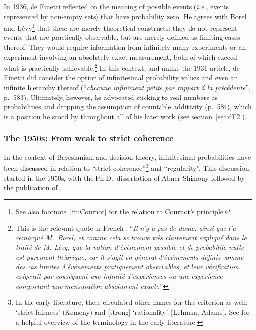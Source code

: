 In 1936, de Finetti reflected on the meaning of possible events (\textit{i.e.}, events represented by non-empty sets) that have probability zero. He agrees with Borel and L{\'e}vy\footnote{See also footnote~\ref{fn:Cournot} for the relation to Cournot's principle.} that these are merely theoretical constructs: they do not represent events that are practically observable, but are merely defined as limiting cases thereof. They would require information from infinitely many experiments or an experiment involving an absolutely exact measurement, both of which exceed what is practically achievable.\footnote{This is the relevant quote in French \citep[p.~577]{deFinetti:1936}: ``\textit{Il n'y a pas de doute, ainsi que l'a remarqu\'{e} M.\ Borel, et comme cela se trouve tr\`{e}s clairement expliqu\'{e} dans le trait\'{e} de M. L\'{e}vy, que la notion d'\'{e}v\'{e}nement possible et de probabilite nulle est purement th\'{e}orique, car il s'agit en g\'{e}neral d'\'{e}v\'{e}nements d\'{e}finis comme des cas limites d'\'{e}v\'{e}nements pratiquement observables, et leur v\'{e}rification exigerait par cons\'{e}quent une \emph{infinit\'{e}} d'exp\'{e}riences ou une exp\'{e}rience comportant une mensuration absolument \emph{exacte}}.''}
In this context, and unlike the 1931 article, de Finetti did consider the option of infinitesimal probability values and even an infinite hierarchy thereof (``\textit{chacune infiniment petite par rapport \'{a} la pr\'{e}c\'{e}dente}'', p.~583). Ultimately, however, he advocated sticking to real numbers as probabilities and dropping the assumption of countable additivity (p.~584), which is a position he stood by throughout all of his later work (see section~\ref{sec:dF2}).

\subsubsection*{The 1950s: From weak to strict coherence}\label{sec:coherence}
In the context of Bayesianism and decision theory, infinitesimal probabilities have been discussed in relation to ``strict coherence''\footnote{In the early literature, there circulated other names for this criterion as well: `strict fairness' (Kemeny) and [strong] `rationality' (Lehman, Adams). See \citet[p.~114]{Carnap:1971b} for a helpful overview of the terminology in the early literature.} and ``regularity''. This discussion started in the 1950s, with the Ph.D.\ dissertation of Abner Shimony followed by the publication of \citet{Shimony:1955}.

